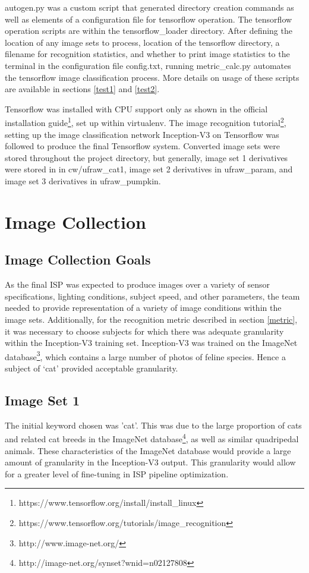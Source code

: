 \documentclass{report}
\begin{document}
	autogen.py was a custom script that generated directory creation commands as well as elements of a configuration file for tensorflow operation. The tensorflow operation scripts are within the tensorflow\_loader directory. After defining the location of any image sets to process, location of the tensorflow directory, a filename for recognition statistics, and whether to print image statistics to the terminal in the configuration file config.txt, running metric\_calc.py automates the tensorflow image classification process. More details on usage of these scripts are available in sections \ref{test1} and \ref{test2}.
	
	Tensorflow was installed with CPU support only as shown in the official installation guide\footnote{https://www.tensorflow.org/install/install\_linux}, set up within virtualenv. The image recognition tutorial\footnote{https://www.tensorflow.org/tutorials/image\_recognition}, setting up the image classification network Inception-V3 on Tensorflow was followed to produce the final Tensorflow system. Converted image sets were stored throughout the project directory, but generally, image set 1 derivatives were stored in in cw/ufraw\_cat1, image set 2 derivatives in ufraw\_param, and image set 3 derivatives in ufraw\_pumpkin.



\section{Image Collection}
\subsection{Image Collection Goals}
As the final ISP was expected to produce images over a variety of sensor specifications, lighting conditions, subject speed, and other parameters, the team needed to provide representation of a variety of image conditions within the image sets. Additionally, for the recognition metric described in section \ref{metric}, it was necessary to choose subjects for which there was adequate granularity within the Inception-V3 training set. Inception-V3 was trained on the ImageNet database\footnote{http://www.image-net.org/}, which contains a large number of photos of feline species. Hence a subject of `cat' provided acceptable granularity.

\subsection{Image Set 1}
The initial keyword chosen was 'cat'. This was due to the large proportion of cats and related cat breeds in the ImageNet database\footnote{http://image-net.org/synset?wnid=n02127808}, as well as similar quadripedal animals. These characteristics of the ImageNet database would provide a large amount of granularity in the Inception-V3 output. This granularity would allow for a greater level of fine-tuning in ISP pipeline optimization.
\end{document}
